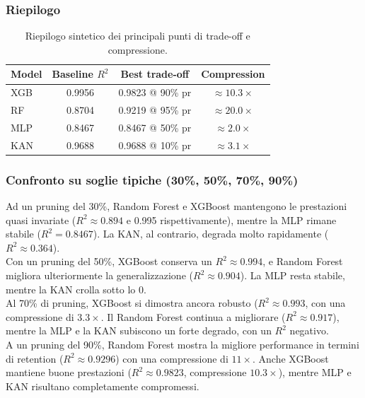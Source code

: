 \documentclass[a4paper,12pt]{report}
\begin{document}
	\subsubsection{Riepilogo}
	\begin{table}[H]
		\centering
		\begin{tabular}{lccc}
			\toprule
			\textbf{Model} & \textbf{Baseline \(R^2\)} & \textbf{Best trade-off} & \textbf{Compression} \\
			\midrule
			XGB           & 0.9956 & 0.9823 @ 90\% pr & \(\approx 10.3\times\) \\
			RF            & 0.8704 & 0.9219 @ 95\% pr & \(\approx 20.0\times\) \\
			MLP           & 0.8467 & 0.8467 @ 50\% pr & \(\approx 2.0\times\) \\
			KAN           & 0.9688 & 0.9688 @ 10\% pr & \(\approx 3.1\times\) \\
			\bottomrule
		\end{tabular}
		\caption{Riepilogo sintetico dei principali punti di trade-off e compressione.}
	\end{table}
	
	\subsubsection{Confronto su soglie tipiche (30\%, 50\%, 70\%, 90\%)}
	Ad un pruning del 30\%, Random Forest e XGBoost mantengono le prestazioni quasi invariate (\(R^2 \approx 0.894\) e 0.995 rispettivamente), mentre la MLP rimane stabile (\(R^2 = 0.8467\)). La KAN, al contrario, degrada molto rapidamente (\(R^2 \approx 0.364\)). \\
	Con un pruning del 50\%, XGBoost conserva un \(R^2 \approx 0.994\), e Random Forest migliora ulteriormente la generalizzazione (\(R^2 \approx 0.904\)). La MLP resta stabile, mentre la KAN crolla sotto lo 0. \\
	Al 70\% di pruning, XGBoost si dimostra ancora robusto (\(R^2 \approx 0.993\), con una compressione di $3.3\times$. Il Random Forest continua a migliorare (\(R^2 \approx 0.917\)), mentre la MLP e la KAN subiscono un forte degrado, con un $R^2$ negativo. \\
	A un pruning del 90\%, Random Forest mostra la migliore performance in termini di retention (\(R^2 \approx 0.9296\)) con una compressione di $11\times$. Anche XGBoost mantiene buone prestazioni (\(R^2 \approx 0.9823\), compressione $10.3\times$), mentre MLP e KAN risultano completamente compromessi.
	
\end{document}
